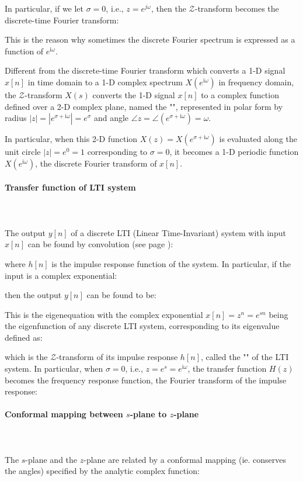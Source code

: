 	In particular, if we let $\sigma=0$, i.e., $z=e^{j\omega}$, then the $\mathcal{Z}$-transform becomes the discrete-time Fourier transform:
	
	This is the reason why sometimes the discrete Fourier spectrum is expressed as a function of $e^{\mathrm{i}\omega}$.
	
	
	Different from the discrete-time Fourier transform which converts a 1-D signal $x[n]$ in time domain to a 1-D complex spectrum $X(e^{\mathrm{i}\omega})$ in frequency domain, the $\mathcal{Z}$-transform $X(s)$ converts the 1-D signal $x[n]$ to a complex function defined over a 2-D complex plane, named the  "", represented in polar form by radius $|z|=|e^{\sigma+\mathrm{i}\omega}|=e^\sigma$ and angle 
	$\angle z=\angle(e^{\sigma+\mathrm{i}\omega})=\omega$. 
	
	In particular, when this 2-D function $X(z)=X(e^{\sigma+\mathrm{i}\omega})$ is evaluated along the unit circle $|z|=e^0=1$ corresponding to $\sigma=0$, it becomes a 1-D periodic function $X(e^{\mathrm{i}\omega})$, the discrete Fourier transform of $x[n]$. 
	
	\pagebreak
	\paragraph{Transfer function of LTI system}\mbox{}\\\\
	The output $y[n]$ of a discrete LTI (Linear Time-Invariant) system with input $x[n]$ can be found by convolution (see page \pageref{convolution}):
	
	where $h[n]$ is the impulse response function of the system. In 	particular, if the input is a complex exponential:
	
	then the output $y[n]$ can be found to be:
	
	This is the eigenequation with the complex exponential $x[n]=z^n=e^{sn}$ being the eigenfunction of any discrete LTI system, corresponding to its eigenvalue defined as:
	
	which is the $\mathcal{Z}$-transform of its impulse response $h[n]$, called the "" of the LTI system. In particular, when $\sigma=0$, i.e., $z=e^s=e^{\mathrm{i}\omega}$, the transfer function $H(z)$ becomes the frequency response function, the Fourier transform of the impulse response:
	
	
	\paragraph{Conformal mapping between $s$-plane to $z$-plane}\mbox{}\\\\
	The $s$-plane and the $z$-plane are related by a conformal mapping (ie. conserves the angles) specified by the analytic complex function:
	

